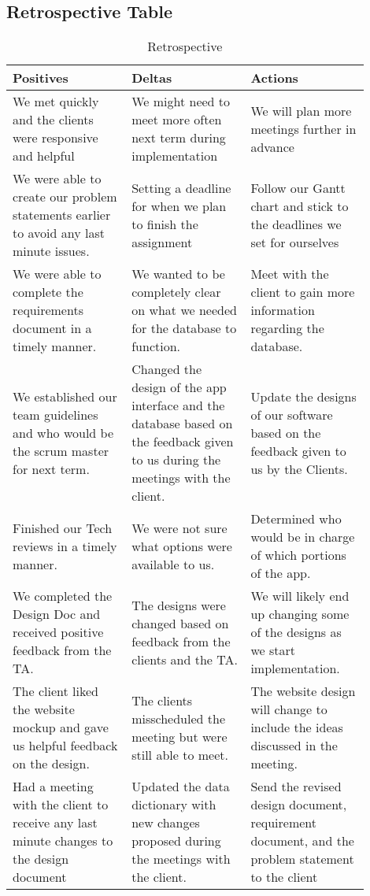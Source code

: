 \documentclass[onecolumn, draftclsnofoot,10pt, compsoc]{IEEEtran}
\begin{document}
\subsection{Retrospective Table}
\begin{table}[ht]
\caption{Retrospective}
\centering

\begin{tabular}{|>{\centering\arraybackslash}p{0.3\linewidth} |>{\centering\arraybackslash}p{0.3\linewidth} |>{\centering\arraybackslash}p{0.3\linewidth}|}
\hline 
    Positives  &   Deltas  & Actions  \\
\hline

    We met quickly and the clients were responsive and helpful   &   We might need to meet more often next term during implementation   &   We will plan more meetings further in advance\\
  
    \hline
    We were able to create our problem statements earlier to avoid any last minute issues. & Setting a deadline for when we plan to finish the assignment & Follow our Gantt chart and stick to the deadlines we set for ourselves\\ 
    \hline
    We were able to complete the requirements document in a timely manner.  & We wanted to be completely clear on what we needed for the database to function.  & Meet with the client to gain more information regarding the database.\\ 
    \hline
    We established our team guidelines and who would be the scrum master for next term.  & Changed the design of the app interface and the database based on the feedback given to us during the meetings with the client.  &  Update the designs of our software based on the feedback given to us by the Clients.  \\ 
    \hline
    Finished our Tech reviews in a timely manner. & We were not sure what options were available to us. & Determined who would be in charge of which portions of the app.\\ 
    \hline
    We completed the Design Doc and received positive feedback from the TA. & The designs were changed based on feedback from the clients and the TA. & We will likely end up changing some of the designs as we start implementation.\\ 
    \hline
    The client liked the website mockup and gave us helpful feedback on the design. & The clients misscheduled the meeting but were still able to meet. & The website design will change to include the ideas discussed in the meeting.\\ 
    \hline
     Had a meeting with the client to receive any last minute changes to the design document & Updated the data dictionary with new changes proposed during the meetings with the client. & Send the revised design document, requirement document, and the problem statement to the client\\ 
    \hline
    

\end{tabular}
\end{table}
\end{document}
